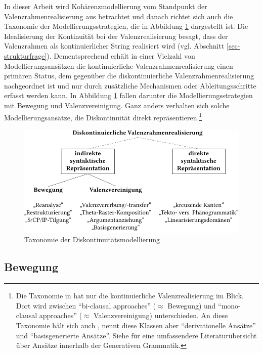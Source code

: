 In dieser Arbeit wird Kohärenzmodellierung vom Standpunkt der Valenzrahmenrealisierung aus betrachtet und danach richtet sich auch die Taxonomie der Modellierungsstrategien, die in Abbildung \ref{fig-kohaerenz-strategien} dargestellt ist. Die Idealisierung der Kontinuität bei der Valenzrealisierung besagt, dass der Valenzrahmen als kontinuierlicher String realisiert wird (vgl. Abschnitt \ref{sec-strukturfrage}). Dementsprechend erhält in einer Vielzahl von Modellierungsansätzen die kontinuierliche Valenzrahmenrealisierung einen primären Status, dem gegenüber die diskontinuierliche Valenzrahmenrealisierung nachgeordnet ist und nur durch zusätzliche Mechanismen oder Ableitungsschritte erfasst werden kann. In Abbildung \ref{fig-kohaerenz-strategien} fallen darunter die Modellierungsstrategien mit Bewegung und Valenzvereinigung. Ganz anders verhalten sich solche Modellierungsansätze, die Diskontinuität direkt repräsentieren.\footnote{Die Taxonomie in \citet[10ff]{Wurmbrand:01} hat nur die kontinuierliche Valenzrealisierung im Blick. Dort wird zwischen "`bi-clausal approaches"' ($\approx$ Bewegung) und "`mono-clausal approaches"' ($\approx$ Valenzvereinigung) unterschieden. An diese Taxonomie hält sich auch \citet[21]{Grosse:05}, nennt diese Klassen aber "`derivationelle Ansätze"' und "`basisgenerierte Ansätze"'. Siehe \cite{Wurmbrand:01} für eine umfassendere Literaturübersicht über Ansätze innerhalb der Generativen Grammatik.}

\begin{figure}
\centering
\includegraphics{graphics/abb61.pdf}
\caption{\label{fig-kohaerenz-strategien}Taxonomie der Diskontinuitätsmodellierung}
\end{figure}


\subsection{Bewegung}

